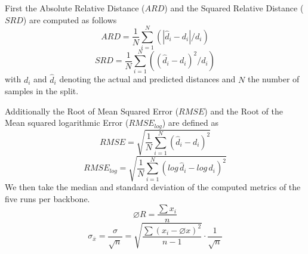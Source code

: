\documentclass[a4paper, 11pt]{article}
\begin{document}
\begin{multicols}{2}
\begin{flushleft}
First the Absolute Relative Distance ($ARD$) and the Squared Relative Distance ($SRD$) are computed as follows
\begin{equation}\label{eq:ard}
ARD = \frac{1}{N} \sum_{i=1}^N (|\hat{d}_i - d_i| / d_i)
\end{equation}
\begin{equation}\label{eq:srd}
SRD = \frac{1}{N} \sum_{i=1}^N ((\hat{d}_i - d_i)^2 / d_i)
\end{equation}
with $d_i$ and $\hat{d}_i$ denoting the actual and predicted distances and $N$ the number of samples in the split.

Additionally the Root of Mean Squared Error ($RMSE$) and the Root of the Mean squared logarithmic Error ($RMSE_{log}$) are defined as
\begin{equation}\label{eq:rmse}
RMSE = \sqrt{\frac{1}{N} \sum_{i=1}^N (\hat{d}_i - d_i)^2}
\end{equation}
\begin{equation}\label{eq:rmselog}
RMSE_{log} = \sqrt{\frac{1}{N} \sum_{i=1}^N (log\, \hat{d}_i - log\, d_i)^2}
\end{equation}
We then take the median and standard deviation of the computed metrics of the five runs per backbone.
\begin{equation}\label{eq:mean}
\varnothing R = \frac{\sum x_i}{n}
\end{equation}
\begin{equation}\label{eq:std}
\sigma_{\bar{x}} = \frac{\sigma}{\sqrt{n}} = \sqrt{\frac{\sum(x_i - \varnothing x)^2}{n-1}} \cdot \frac{1}{\sqrt{n}}
\end{equation}
\end{flushleft}


\end{multicols}
\end{document}
